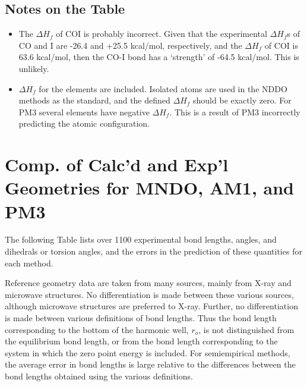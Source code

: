 \subsection*{Notes on the Table}
\begin{itemize}
\item The $\Delta H_f$ of COI is probably incorrect.  Given that the
experimental $\Delta H_f$s of CO and I are -26.4 and +25.5 kcal/mol,
respectively, and  the $\Delta H_f$ of COI is 63.6 kcal/mol, then the CO-I bond
has a `strength' of -64.5 kcal/mol.  This is unlikely.
\item $\Delta H_f$ for the elements are included. Isolated atoms are used in
the NDDO methods as the standard, and the defined $\Delta H_f$ should be
exactly zero.  For PM3 several elements have negative $\Delta H_f$.  This is a
result of  PM3 incorrectly predicting the atomic configuration.
\end{itemize}



\section{Comp. of Calc'd and Exp'l Geometries for MNDO, AM1, and PM3}

The following Table lists over 1100 experimental bond lengths, angles,  and
dihedrals or torsion angles, and the errors in the prediction of these
quantities for each method.

Reference geometry data are taken from many sources, mainly from X-ray and
microwave structures. No differentiation is made between these various sources,
although microwave structures are preferred to X-ray. Further, no
differentiation is made between various definitions of bond lengths. Thus the
bond length corresponding to the bottom of the harmonic well, $r_o$, is not
distinguished from the equilibrium bond length, or from the bond length
corresponding to the system in which the zero point energy is included. For
semiempirical methods, the average error in bond lengths is large relative to
the differences between the bond lengths obtained using the various
definitions.

